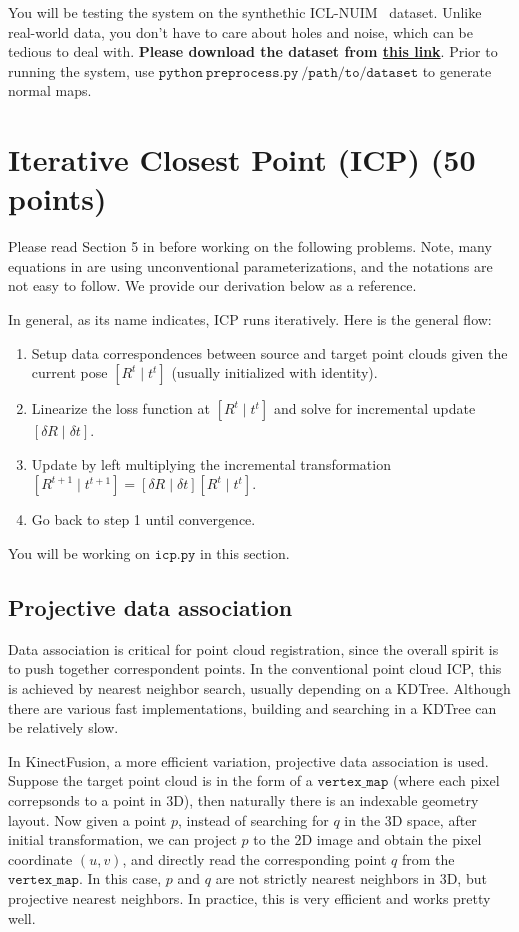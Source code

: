 \documentclass[12pt, a4paper]{article}
\begin{document}
You will be testing the system on the synthethic ICL-NUIM~\cite{icl_nuim} dataset. Unlike real-world data, you don't have to care about holes and noise, which can be tedious to deal with. \textbf{Please download the dataset from \href{http://www.doc.ic.ac.uk/~ahanda/living_room_traj2_frei_png.tar.gz}{this link}}. Prior to running the system, use $\mathtt{python~preprocess.py~/path/to/dataset}$ to generate normal maps.


\section{Iterative Closest Point (ICP) (50 points)}
Please read Section 5 in \cite{fusion} before working on the following problems. Note, many equations in \cite{fusion} are using unconventional parameterizations, and the notations are not easy to follow. We provide our derivation below as a reference.

In general, as its name indicates, ICP runs iteratively. Here is the general flow:
\begin{enumerate}
    \item Setup data correspondences between source and target point clouds given the current pose $[R^t \mid t^t]$ (usually initialized with identity).
    \item Linearize the loss function at $[R^t \mid t^t]$ and solve for incremental update $[\delta R \mid \delta t]$.
    \item Update by left multiplying the incremental transformation $[R^{t+1} \mid t^{t+1}] = [\delta R \mid \delta t] [R^t \mid t^t]$.
    \item Go back to step 1 until convergence.
\end{enumerate}
You will be working on $\mathtt{icp.py}$ in this section.

\subsection{Projective data association}
Data association is critical for point cloud registration, since the overall spirit is to push together correspondent points.
In the conventional point cloud ICP, this is achieved by nearest neighbor search, usually depending on a KDTree. Although there are various fast implementations, building and searching in a KDTree can be relatively slow.

In KinectFusion, a more efficient variation, projective data association is used. Suppose the target point cloud is in the form of a $\mathtt{vertex\_map}$ (where each pixel correpsonds to a point in 3D), then naturally there is an indexable geometry layout. Now given a point $p$, instead of searching for $q$ in the 3D space, after initial transformation, we can project $p$ to the 2D image and obtain the pixel coordinate $(u, v)$, and directly read the corresponding point $q$ from the $\mathtt{vertex\_map}$. In this case, $p$ and $q$ are not strictly nearest neighbors in 3D, but projective nearest neighbors. In practice, this is very efficient and works pretty well.
\end{document}
